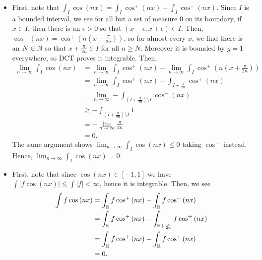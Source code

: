 \documentclass[a4paper]{article}
\begin{document}
\begin{problem}[43]
	\begin{itemize}
		\item First, note that \(\int_{I} \cos\left( nx \right)  = \int_{I} \cos^{+}\left( nx  \right) + \int_{I} \cos^{-}\left( nx  \right)  \). Since \(I\) is a bounded interval, we see for all but a set of measure \(0\) on its boundary, if \(x \in I\), then there is an \(\epsilon > 0\) so that \(\left( x- \epsilon, x + \epsilon \right) \in I \). Then, \(\cos^{-}\left( nx \right)  = \cos^{+}\left( n\left( x + \frac{\pi}{2n} \right)  \right) \), so for almost every \(x\), we find there is an \(N \in \mathbb{N}\) so that \(x + \frac{\pi}{2n} \in I\) for all \(n \ge N\). Moreover it is bounded by \(g=1\) everywhere, so DCT proves it integrable. Then,
			\begin{align*}
				\lim_{n \to \infty} \int_{I} \cos \left( nx \right)  &=  \lim_{n \to \infty} \int _{I} \cos ^{+}\left( nx \right)  - \lim_{n \to \infty} \int_{I} \cos ^{+}\left( n\left( x + \frac{\pi}{2n} \right)  \right)  \\
				&= \lim_{n \to \infty} \int_{I} \cos ^{+}\left( nx \right)  - \int_{I + \frac{\pi}{2n}} \cos^{+}\left( nx  \right)  \\
				&=  \lim_{n \to \infty}- \int _{\left( I+\frac{\pi}{2n} \right) \setminus I} \cos^{+}\left( nx \right)  \\
				&\ge -  \int _{\left( I + \frac{\pi}{2n} \right) \setminus I} 1\\
				&= - \lim_{n \to \infty}\frac{\pi}{2n} \\
				&= 0
			.\end{align*}
			The same argument shows \(\lim_{n \to \infty} \int_{ I } \cos \left( nx \right)  \le 0\) taking \(\cos ^{-}\) instead. Hence, \(\lim_{n \to \infty} \int_{I}\cos\left( nx \right)  = 0\).
		\item 	First, note that since \(\cos\left( nx \right) \in \left[ -1, 1 \right] \) we have \(\int \left| f \cos\left( nx \right)\right| \le \int \left| f \right| < \infty \), hence it is integrable. Then, we see
			\begin{align*}
				\int f \cos\left( nx \right) &= \int_{\mathbb{R}} f \cos ^{+}\left( nx \right) - \int_{\mathbb{R}} f \cos^{-}\left( nx \right) \\
				&= \int_{\mathbb{R}}f \cos^{+}\left( nx \right) - \int_{\mathbb{R} + \frac{\pi}{2n}} f \cos^{+}\left( nx \right)   \\
				&= \int_{\mathbb{R}} f \cos^{+}\left( nx \right) - \int_{\mathbb{R}} f \cos^{+}\left( nx \right)  \\
				&= 0
			.\end{align*}
	\end{itemize}
\end{problem}
\end{document}
